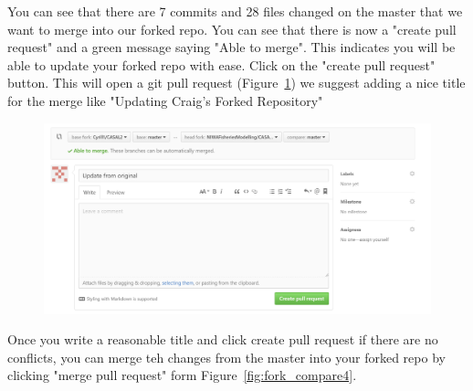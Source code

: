 You can see that there are 7 commits and 28 files changed on the master that we want to merge into our forked repo. You can see that there is now a "create pull request" and a green message saying "Able to merge". This indicates you will be able to update your forked repo with ease. Click on the "create pull request" button. This will open a git pull request (Figure~\ref{fig:fork_compare3}) we suggest adding a nice title for the merge like "Updating Craig's Forked Repository" 
\clearpage
\begin{figure}[!ht]
	\includegraphics[scale=0.6]{Figures/Compare_fork5.png}
	\caption{}\label{fig:fork_compare3}
\end{figure}

Once you write a reasonable title and click create pull request if there are no conflicts, you can merge teh changes from the master into your forked repo by clicking "merge pull request" form Figure~\ref{fig:fork_compare4}.

